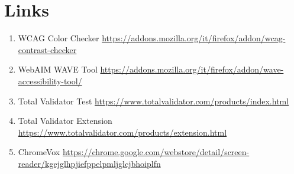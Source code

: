 \section*{Links}
\begin{enumerate}
	\item WCAG Color Checker \url{https://addons.mozilla.org/it/firefox/addon/wcag-contrast-checker} 
    \item WebAIM WAVE Tool \url{https://addons.mozilla.org/it/firefox/addon/wave-accessibility-tool/} 
    \item Total Validator Test \url{https://www.totalvalidator.com/products/index.html}
    \item Total Validator Extension \url{https://www.totalvalidator.com/products/extension.html}
    \item ChromeVox \url{https://chrome.google.com/webstore/detail/screen-reader/kgejglhpjiefppelpmljglcjbhoiplfn}
\end{enumerate}
    